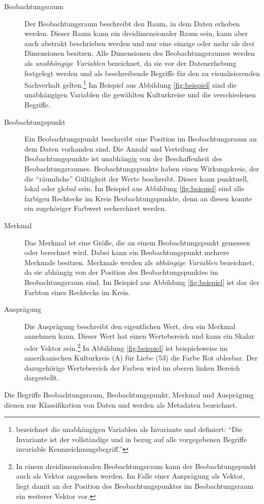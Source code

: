 \documentclass[a4paper, 
               12pt,
               DIV=calc,
               version=first,
               pdftex,
               headsepline,
               footsepline,
               bibtotocnumbered,
               liststotocnumbered]{scrreprt}
\begin{document}
\begin{description}
\item[Beobachtungsraum]
Der Beobachtungsraum beschreibt den Raum, in dem Daten erhoben werden. Dieser Raum kann ein
dreidimensionaler Raum sein, kann aber auch abstrakt beschrieben werden und nur eine einzige oder
mehr als drei Dimensionen besitzen. Alle Dimensionen des Beobachtungsraumes werden als \textit{unabhängige
Variablen} bezeichnet, da sie vor der Datenerhebung festgelegt werden und als beschreibende Begriffe für
den zu visualisierenden Sachverhalt gelten.\footnote{\citep[S.\,24]{Bertin} bezeichnet die unabhängigen
Variablen als Invariante und definiert: "`Die Invariante ist der vollständige und in bezug auf alle vorgegebenen
Begriffe invariable Kennzeichnungsbegriff."'} Im Beispiel aus Abbildung \ref{fig:beispiel} sind die
unabhängigen Variablen die gewählten Kulturkreise und die verschiedenen Begriffe.
\item[Beobachtungspunkt]
Ein Beobachtungspunkt beschreibt eine Position im Beobachtungsraum an dem Daten vorhanden sind. Die Anzahl und Verteilung
der Beobachtungspunkte ist unabhängig von der Beschaffenheit des Beobachtungsraumes. Beobachtungspunkte haben einen
Wirkungskreis, der die "`räumliche"' Gültigkeit der Werte beschreibt. Dieser kann punktuell, lokal oder global sein.
Im Beispiel aus Abbildung \ref{fig:beispiel} sind alle farbigen Rechtecke im Kreis Beobachtungspunkte, denn an
diesen konnte ein zugehöriger Farbwert recherchiert werden.
\item[Merkmal]
Das Merkmal ist eine Größe, die an einem Beobachtungspunkt gemessen oder berechnet wird. Dabei kann
ein Beobachtungspunkt mehrere Merkmale besitzen. Merkmale werden als \textit{abhängige Variablen} bezeichnet, da
sie abhängig von der Position des Beobachtungspunktes im Beobachtungsraum sind.
Im Beispiel aus Abbildung \ref{fig:beispiel} ist das der Farbton eines Rechtecks im Kreis.
\item[Ausprägung]
Die Ausprägung beschreibt den eigentlichen Wert, den ein Merkmal annehmen kann. Dieser Wert hat einen
Wertebereich und kann ein Skalar oder Vektor sein.\footnote{In einem dreidimensionalen Beobachtungsraum
kann der Beobachtungspunkt auch als Vektor angesehen werden. Im Falle einer Ausprägung als Vektor, liegt damit
an der Position des Beobachtungspunktes im Beobachtungsraum ein weiterer Vektor vor.}
In Abbildung \ref{fig:beispiel} ist beispielsweise im amerikanischen Kulturkreis (A) für Liebe (53) die Farbe
Rot ablesbar. Der dazugehörige Wertebereich der Farben wird im oberen linken Bereich dargestellt.
\end{description}
Die Begriffe Beobachtungsraum, Beobachtungspunkt, Merkmal und Ausprägung dienen zur Klassifikation von Daten
und werden als Metadaten bezeichnet.
\end{document}
